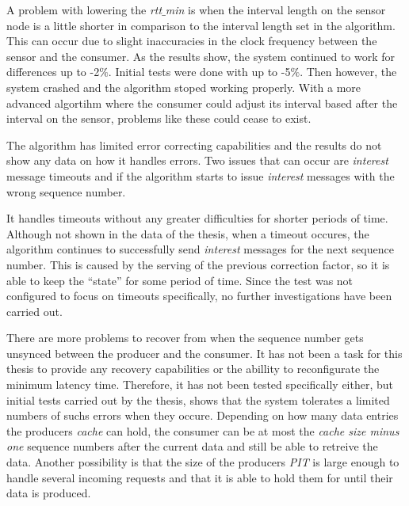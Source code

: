 A problem with lowering the \textit{rtt$\_$min} is when the interval length on the sensor node is a little shorter in comparison to the interval length set in the algorithm. This can occur due to slight inaccuracies in the clock frequency between the sensor and the consumer. 
As the results show, the system continued to work for differences up to -2$\%$. Initial tests were done with up to -5$\%$. Then however, the system crashed and the algorithm stoped working properly. With a more advanced algortihm where the consumer could adjust its interval based after the interval on the sensor, problems like these could cease to exist.

%	

The algorithm has limited error correcting capabilities and the results do not show any data on how it handles errors. Two issues that can occur are \textit{interest} message timeouts and if the algorithm starts to issue \textit{interest} messages with the wrong sequence number. 

It handles timeouts without any greater difficulties for shorter periods of time. Although not shown in the data of the thesis, when a timeout occures, the algorithm continues to successfully send \textit{interest} messages for the next sequence number. This is caused by the serving of the previous correction factor, so it is able to keep the ``state'' for some period of time. Since the test was not configured to focus on timeouts specifically, no further investigations have been carried out.

There are more problems to recover from when the sequence number gets unsynced between the producer and the consumer. 
It has not been a task for this thesis to provide any recovery capabilities or the abillity to reconfigurate the minimum latency time. Therefore, it has not been tested specifically either, but initial tests carried out by the thesis, shows that the system tolerates a limited numbers of suchs errors when they occure. Depending on how many data entries the producers \textit{cache} can hold, the consumer can be at most the \textit{cache size minus one} sequence numbers after the current data and still be able to retreive the data. 
Another possibility is that the size of the producers \textit{PIT} is large enough to handle several incoming requests and that it is able to hold them for until their data is produced. 




